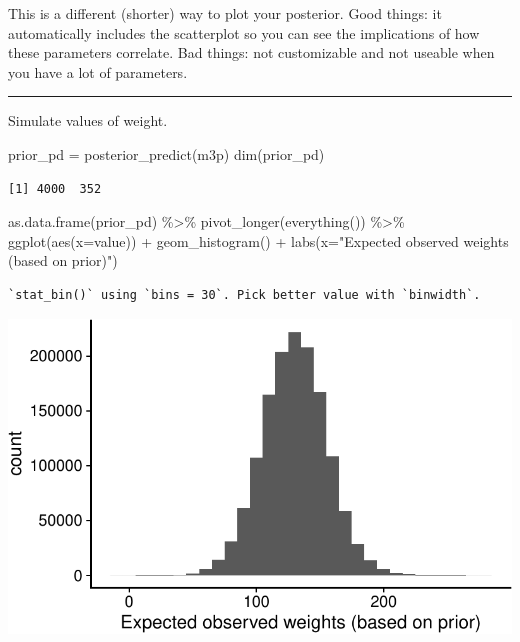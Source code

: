 \documentclass[
  letterpaper,
  DIV=11,
  numbers=noendperiod]{scrartcl}
\newenvironment{Shaded}{\begin{snugshade}}{\end{snugshade}}
\newcommand{\AttributeTok}[1]{\textcolor[rgb]{0.40,0.45,0.13}{#1}}
\newcommand{\FunctionTok}[1]{\textcolor[rgb]{0.28,0.35,0.67}{#1}}
\newcommand{\NormalTok}[1]{\textcolor[rgb]{0.00,0.23,0.31}{#1}}
\newcommand{\OtherTok}[1]{\textcolor[rgb]{0.00,0.23,0.31}{#1}}
\newcommand{\SpecialCharTok}[1]{\textcolor[rgb]{0.37,0.37,0.37}{#1}}
\newcommand{\StringTok}[1]{\textcolor[rgb]{0.13,0.47,0.30}{#1}}
\begin{document}
This is a different (shorter) way to plot your posterior. Good things:
it automatically includes the scatterplot so you can see the
implications of how these parameters correlate. Bad things: not
customizable and not useable when you have a lot of parameters.

\begin{center}\rule{0.5\linewidth}{0.5pt}\end{center}

Simulate values of weight.

\begin{Shaded}
\begin{Highlighting}[]
\NormalTok{prior\_pd }\OtherTok{=} \FunctionTok{posterior\_predict}\NormalTok{(m3p)}
\FunctionTok{dim}\NormalTok{(prior\_pd)}
\end{Highlighting}
\end{Shaded}

\begin{verbatim}
[1] 4000  352
\end{verbatim}

\begin{Shaded}
\begin{Highlighting}[]
\FunctionTok{as.data.frame}\NormalTok{(prior\_pd) }\SpecialCharTok{\%\textgreater{}\%} 
  \FunctionTok{pivot\_longer}\NormalTok{(}\FunctionTok{everything}\NormalTok{()) }\SpecialCharTok{\%\textgreater{}\%} 
  \FunctionTok{ggplot}\NormalTok{(}\FunctionTok{aes}\NormalTok{(}\AttributeTok{x=}\NormalTok{value)) }\SpecialCharTok{+}
  \FunctionTok{geom\_histogram}\NormalTok{() }\SpecialCharTok{+}
  \FunctionTok{labs}\NormalTok{(}\AttributeTok{x=}\StringTok{"Expected observed weights (based on prior)"}\NormalTok{)}
\end{Highlighting}
\end{Shaded}

\begin{verbatim}
`stat_bin()` using `bins = 30`. Pick better value with `binwidth`.
\end{verbatim}

\includegraphics[width=17.1875in,height=\textheight]{lecture02-1_files/figure-pdf/unnamed-chunk-18-1.pdf}
\end{document}
